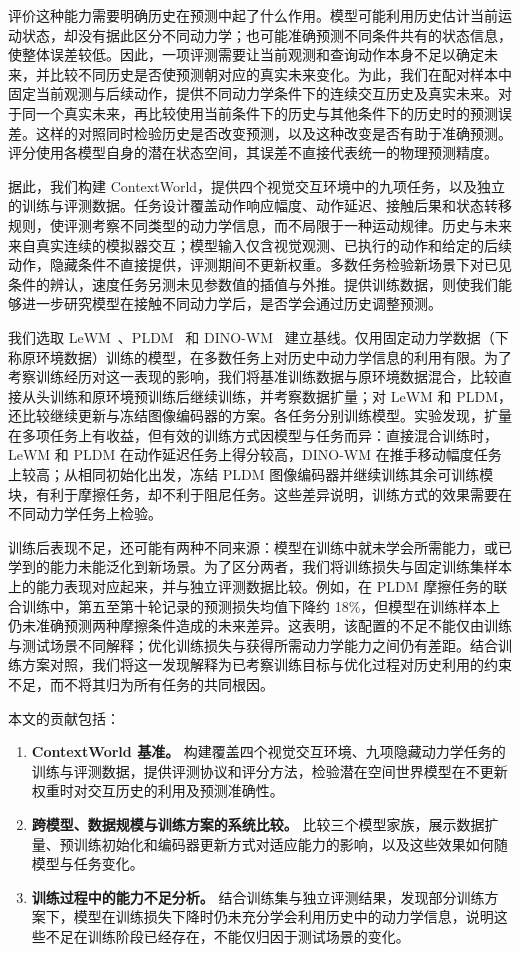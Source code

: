 \documentclass[10pt,twocolumn,letterpaper]{article}
\begin{document}
评价这种能力需要明确历史在预测中起了什么作用。模型可能利用历史估计当前运动状态，却没有据此区分不同动力学；也可能准确预测不同条件共有的状态信息，使整体误差较低。因此，一项评测需要让当前观测和查询动作本身不足以确定未来，并比较不同历史是否使预测朝对应的真实未来变化。为此，我们在配对样本中固定当前观测与后续动作，提供不同动力学条件下的连续交互历史及真实未来。对于同一个真实未来，再比较使用当前条件下的历史与其他条件下的历史时的预测误差。这样的对照同时检验历史是否改变预测，以及这种改变是否有助于准确预测。评分使用各模型自身的潜在状态空间，其误差不直接代表统一的物理预测精度。

据此，我们构建 ContextWorld，提供四个视觉交互环境中的九项任务，以及独立的训练与评测数据。任务设计覆盖动作响应幅度、动作延迟、接触后果和状态转移规则，使评测考察不同类型的动力学信息，而不局限于一种运动规律。历史与未来来自真实连续的模拟器交互；模型输入仅含视觉观测、已执行的动作和给定的后续动作，隐藏条件不直接提供，评测期间不更新权重。多数任务检验新场景下对已见条件的辨认，速度任务另测未见参数值的插值与外推。提供训练数据，则使我们能够进一步研究模型在接触不同动力学后，是否学会通过历史调整预测。

我们选取 LeWM~\cite{maes2026leworldmodel}、PLDM~\cite{sobal2025pldm} 和 DINO-WM~\cite{zhou2025dinowm} 建立基线。仅用固定动力学数据（下称原环境数据）训练的模型，在多数任务上对历史中动力学信息的利用有限。为了考察训练经历对这一表现的影响，我们将基准训练数据与原环境数据混合，比较直接从头训练和原环境预训练后继续训练，并考察数据扩量；对 LeWM 和 PLDM，还比较继续更新与冻结图像编码器的方案。各任务分别训练模型。实验发现，扩量在多项任务上有收益，但有效的训练方式因模型与任务而异：直接混合训练时，LeWM 和 PLDM 在动作延迟任务上得分较高，DINO-WM 在推手移动幅度任务上较高；从相同初始化出发，冻结 PLDM 图像编码器并继续训练其余可训练模块，有利于摩擦任务，却不利于阻尼任务。这些差异说明，训练方式的效果需要在不同动力学任务上检验。

训练后表现不足，还可能有两种不同来源：模型在训练中就未学会所需能力，或已学到的能力未能泛化到新场景。为了区分两者，我们将训练损失与固定训练集样本上的能力表现对应起来，并与独立评测数据比较。例如，在 PLDM 摩擦任务的联合训练中，第五至第十轮记录的预测损失均值下降约 18\%，但模型在训练样本上仍未准确预测两种摩擦条件造成的未来差异。这表明，该配置的不足不能仅由训练与测试场景不同解释；优化训练损失与获得所需动力学能力之间仍有差距。结合训练方案对照，我们将这一发现解释为已考察训练目标与优化过程对历史利用的约束不足，而不将其归为所有任务的共同根因。

本文的贡献包括：

\begin{enumerate}
\item \textbf{ContextWorld 基准。} 构建覆盖四个视觉交互环境、九项隐藏动力学任务的训练与评测数据，提供评测协议和评分方法，检验潜在空间世界模型在不更新权重时对交互历史的利用及预测准确性。
\item \textbf{跨模型、数据规模与训练方案的系统比较。} 比较三个模型家族，展示数据扩量、预训练初始化和编码器更新方式对适应能力的影响，以及这些效果如何随模型与任务变化。
\item \textbf{训练过程中的能力不足分析。} 结合训练集与独立评测结果，发现部分训练方案下，模型在训练损失下降时仍未充分学会利用历史中的动力学信息，说明这些不足在训练阶段已经存在，不能仅归因于测试场景的变化。
\end{enumerate}
\end{document}
